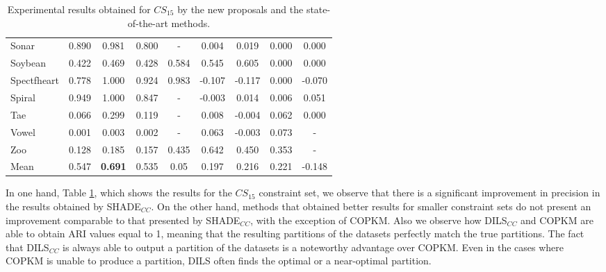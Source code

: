 \begin{table}[!h]
{\begin{tabular}{lcccccccc}
			Sonar & 0.890 & 0.981 & 0.800 & - & 0.004 & 0.019 & 0.000 & 0.000 \\
			Soybean & 0.422 & 0.469 & 0.428 & 0.584 & 0.545 & 0.605 & 0.000 & 0.000 \\
			Spectfheart & 0.778 & 1.000 & 0.924 & 0.983 & -0.107 & -0.117 & 0.000 & -0.070 \\
			Spiral & 0.949 & 1.000 & 0.847 & - & -0.003 & 0.014 & 0.006 & 0.051 \\
			Tae & 0.066 & 0.299 & 0.119 & - & 0.008 & -0.004 & 0.062 & 0.000 \\
			Vowel & 0.001 & 0.003 & 0.002 & - & 0.063 & -0.003 & 0.073 & - \\
			Zoo & 0.128 & 0.185 & 0.157 & 0.435 & 0.642 & 0.450 & 0.353 & - \\
			\hline
			Mean & 0.547 & \textbf{0.691} & 0.535 & 0.05 & 0.197 & 0.216 & 0.221 & -0.148 \\
			\hline
			
	\end{tabular}}
	
	\caption{Experimental results obtained for $CS_{15}$ by the new proposals and the state-of-the-art methods.}
	\label{tab:resultsSOTA15}
\end{table}

In one hand, Table \ref{tab:resultsSOTA15}, which shows the results for the $CS_{15}$ constraint set, we observe that there is a significant improvement in precision in the results obtained by \acs{SHADE}$_{CC}$. On the other hand, methods that obtained better results for smaller constraint sets do not present an improvement comparable to that presented by \acs{SHADE}$_{CC}$, with the exception of \acs{COPKM}. Also we observe how \acs{DILS}$_{CC}$ and \acs{COPKM} are able to obtain \acs{ARI} values equal to 1, meaning that the resulting partitions of the datasets perfectly match the true partitions. The fact that \acs{DILS}$_{CC}$ is always able to output a partition of the datasets is a noteworthy advantage over \acs{COPKM}. Even in the cases where \acs{COPKM} is unable to produce a partition, \acs{DILS} often finds the optimal or a near-optimal partition.

